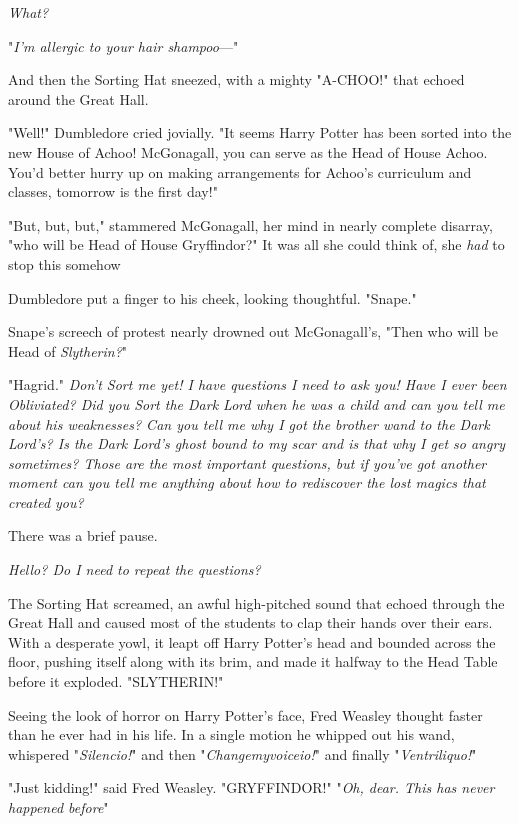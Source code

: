 \emph{What?}

"\emph{I'm allergic to your hair shampoo}---"

And then the Sorting Hat sneezed, with a mighty "A-CHOO!" that echoed around
the Great Hall.

"Well!" Dumbledore cried jovially. "It seems Harry Potter has been sorted into
the new House of Achoo! McGonagall, you can serve as the Head of House Achoo.
You'd better hurry up on making arrangements for Achoo's curriculum and
classes, tomorrow is the first day!"

"But, but, but," stammered McGonagall, her mind in nearly complete disarray,
"who will be Head of House Gryffindor?" It was all she could think of, she
\emph{had} to stop this somehow{\el}

Dumbledore put a finger to his cheek, looking thoughtful. "Snape."

Snape's screech of protest nearly drowned out McGonagall's, "Then who will be
Head of \emph{Slytherin?}"

"Hagrid."
\sbreak
\emph{Don't Sort me yet! I have questions I need to ask you! Have I ever been
Obliviated? Did you Sort the Dark Lord when he was a child and can you tell me
about his weaknesses? Can you tell me why I got the brother wand to the Dark
Lord's? Is the Dark Lord's ghost bound to my scar and is that why I get so
angry sometimes? Those are the most important questions, but if you've got
another moment can you tell me anything about how to rediscover the lost magics
that created you?}

There was a brief pause.

\emph{Hello? Do I need to repeat the questions?}

The Sorting Hat screamed, an awful high-pitched sound that echoed through the
Great Hall and caused most of the students to clap their hands over their ears.
With a desperate yowl, it leapt off Harry Potter's head and bounded across the
floor, pushing itself along with its brim, and made it halfway to the Head
Table before it exploded.
\sbreak
"SLYTHERIN!"

Seeing the look of horror on Harry Potter's face, Fred Weasley thought faster
than he ever had in his life. In a single motion he whipped out his wand,
whispered "\emph{Silencio!}" and then "\emph{Changemyvoiceio!}" and finally
"\emph{Ventriliquo!}"

"Just kidding!" said Fred Weasley. "GRYFFINDOR!"
\sbreak
"\emph{Oh, dear. This has never happened before{\el}}"

